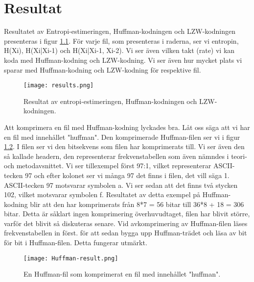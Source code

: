 
\chapter{Resultat}
\label{cha:results}

Resultatet av Entropi-estimeringen, Huffman-kodningen och LZW-kodningen presenteras i figur \ref{fig:results}. För varje fil, som presenteras i raderna, ser vi entropin, H(Xi), H(Xi|Xi-1) och H(Xi|Xi-1, Xi-2). Vi ser även vilken takt (rate) vi kan koda med Huffman-kodning och LZW-kodning. Vi ser även hur mycket plats vi sparar med Huffman-kodning och LZW-kodning för respektive fil.
\begin{figure}
  \texttt{[image: results.png]}
  \caption{Resultat av entropi-estimeringen, Huffman-kodningen och LZW-kodningen.}
  \label{fig:results}
\end{figure}

Att komprimera en fil med Huffman-kodning lyckades bra. Låt oss säga att vi har en fil med innehållet "huffman". Den komprimerade Huffman-filen ser vi i figur \ref{fig:huffmanresults}. I filen ser vi den bitsekvens som filen har komprimerats till. Vi ser även den så kallade headern, den representerar frekvenstabellen som även nämndes i teori- och metodavsnittet. Vi ser tillexempel först 97:1, vilket representerar ASCII-tecken 97 och efter kolonet ser vi många 97 det finns i filen, det vill säga 1. ASCII-tecken 97 motsvarar symbolen a. Vi ser sedan att det finns två stycken 102, vilket motsvarar symbolen f. Resultatet av detta exempel på Huffman-kodning blir att den har komprimerats från 8*7 = 56 bitar till 36*8 + 18 = 306 bitar. Detta är såklart ingen komprimering överhuvudtaget, filen har blivit större, varför det blivit så diskuteras senare. Vid avkomprimering av Huffman-filen läses frekvenstabellen in först. för att sedan bygga upp Huffman-trädet och läsa av bit för bit i Huffman-filen. Detta fungerar utmärkt.
\begin{figure}
  \texttt{[image: Huffman-result.png]}
  \caption{En Huffman-fil som komprimerat en fil med innehållet "huffman".}
  \label{fig:huffmanresults}
\end{figure}

